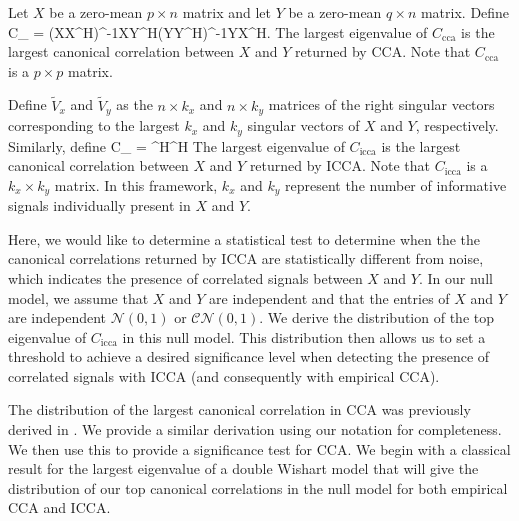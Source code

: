 
Let $X$ be a zero-mean $p\times n$ matrix and let $Y$ be a zero-mean $q\times n$ matrix. Define
\beq\label{eq:c_cca}
C_{} = \left(XX^H\right)^{-1}XY^H\left(YY^H\right)^{-1}YX^H.
\eeq
The largest eigenvalue of $C_{\text{cca}}$ is the largest canonical correlation between $X$ and
$Y$ returned by CCA. Note that $C_{\text{cca}}$ is a $p\times p$ matrix.

Define $\widetilde{V}_x$ and $\widetilde{V}_y$ as the $n\times k_x$ and $n\times k_y$
matrices of the right singular vectors corresponding to the largest $k_x$ and $k_y$
singular vectors of $X$ and $Y$, respectively. Similarly, define
\beq\label{eq:c}
C_{} = \Vxcir^H\Vycir\Vycir^H\Vxcir
\eeq
The largest eigenvalue of $C_{\text{icca}}$ is the largest canonical correlation between $X$ and
$Y$ returned by ICCA. Note that $C_{\text{icca}}$ is a $k_x\times k_y$ matrix. In this framework,
$k_x$ and $k_y$ represent the number of informative signals individually present in $X$
and $Y$.

Here, we would like to determine a statistical test to determine when the the canonical
correlations returned by ICCA are statistically different from noise, which indicates the
presence of correlated signals between $X$ and $Y$. In our null model, we assume that $X$
and $Y$ are independent and that the entries of $X$ and $Y$ are independent
$\mathcal{N}(0,1)$ or $\mathcal{CN}(0,1)$. We derive the distribution of the top
eigenvalue of $C_{\text{icca}}$ in this null model. This distribution then allows us to set a
threshold to achieve a desired significance level when detecting the presence of
correlated signals with ICCA (and consequently with empirical CCA).


The distribution of the largest canonical correlation in CCA was previously derived in
\cite{johnstone2008multivariate}. We provide a similar derivation using our notation for
completeness. We then use this to provide a significance test for CCA. We begin with a
classical result for the largest eigenvalue of a double Wishart model that will give the
distribution of our top canonical correlations in the null model for both empirical CCA
and ICCA.

